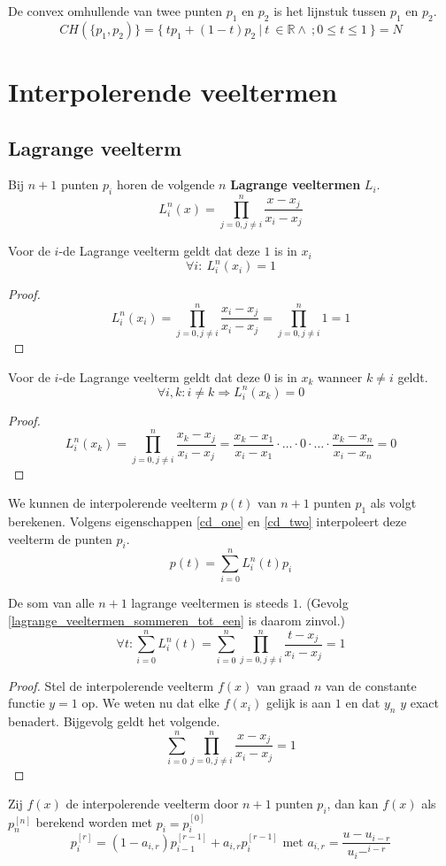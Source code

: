 \documentclass[computergesteund_ontwerp_van_curven_en_oppervlakken.tex]{subfiles}
\begin{document}
\begin{gev}
De convex omhullende van twee punten $p_1$ en $p_2$ is het lijnstuk tussen $p_1$ en $p_2$.
\[
CH(\{p_1, p_2)\} = \{\ tp_1 + (1-t)p_2\ |\ t\ \in \mathbb{R}\wedge\ ;0\le t\le 1\ \} = N
\]
\end{gev}



\section{Interpolerende veeltermen}
\subsection{Lagrange veelterm}
\begin{de}
Bij $n+1$ punten $p_i$ horen de volgende $n$ \textbf{Lagrange veeltermen} $L_i$.
\[
L_{i}^{n}(x) = \prod_{j=0, j \neq i}^{n} \frac{x-x_{j}}{x_{i}-x_{j}}
\]
\end{de}

\begin{ei}
\label{cd_one}
Voor de $i$-de Lagrange veelterm geldt dat deze $1$ is in $x_i$
\[
\forall i:\ L_{i}^{n}(x_i) = 1
\]
\begin{proof}

\[
L_{i}^{n}(x_i)
= \prod_{j=0, j \neq i}^{n} \frac{x_i-x_{j}}{x_{i}-x_{j}}
= \prod_{j=0, j \neq i}^{n} 1
= 1
\]
\end{proof}
\end{ei}

\begin{ei}
\label{cd_two}
Voor de $i$-de Lagrange veelterm geldt dat deze $0$ is in $x_k$ wanneer $k\neq i$ geldt.
\[
\forall i,k:i\neq k \Rightarrow L_i^{n}(x_k) = 0
\]
\begin{proof}
\[
L_{i}^{n}(x_k)
= \prod_{j=0, j \neq i}^{n} \frac{x_k-x_{j}}{x_{i}-x_{j}}
= \frac{x_k-x_{1}}{x_{i}-x_{1}}\cdot \ldots \cdot 0 \cdot \ldots \cdot \frac{x_k-x_{n}}{x_{i}-x_{n}}
= 0
\]
\end{proof}
\end{ei}

\begin{gev}
\label{lagrange_veeltermen_sommeren_tot_een}
We kunnen de interpolerende veelterm $p(t)$ van $n+1$ punten $p_1$ als volgt berekenen. Volgens eigenschappen \ref{cd_one} en \ref{cd_two} interpoleert deze veelterm de punten $p_i$.
\[
p(t) = \sum_{i=0}^{n}L_{i}^{n}(t)p_i
\]
\end{gev}

\begin{ei}
De som van alle $n+1$ lagrange veeltermen is steeds $1$. (Gevolg \ref{lagrange_veeltermen_sommeren_tot_een} is daarom zinvol.)
\[
\forall t: \sum_{i=0}^{n}L_i^{n}(t) = \sum_{i=0}^{n}\prod_{j=0, j \neq i}^{n} \frac{t-x_{j}}{x_{i}-x_{j}} = 1
\]
\begin{proof}
Stel de interpolerende veelterm $f(x)$ van graad $n$ van de constante functie $y=1$ op.
We weten nu dat elke $f(x_i)$ gelijk is aan $1$ en dat $y_n$ $y$ exact benadert.
Bijgevolg geldt het volgende.
\[
\sum_{i=0}^{n}\prod_{j=0,j\neq i}^{n}\frac{x-x_j}{x_i-x_j} = 1
\]
\end{proof}
\end{ei}

\begin{st}
Zij $f(x)$ de interpolerende veelterm door $n+1$ punten $p_i$, dan kan $f(x)$ als $p_{n}^{[n]}$ berekend worden met $p_i = p_i^{[0]}$
\[
p_{i}^{[r]} = (1-a_{i,r})p_{i-1}^{[r-1]} + a_{i,r}p_{i}^{[r-1]} \text{ met } a_{i,r} = \frac{u - u_{i-r}}{u_{i}-^{i-r}}
\]
\end{st}
\end{document}
